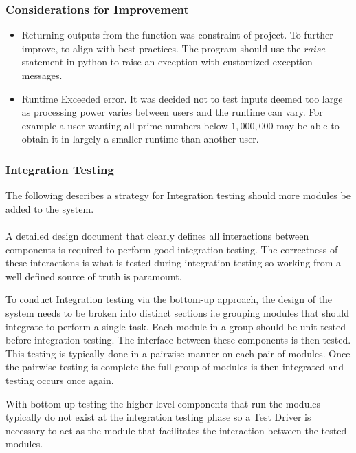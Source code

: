 \documentclass[]{article}
\begin{document}
\subsubsection{Considerations for Improvement}
\begin{itemize}
    \item Returning outputs from the function was constraint of project. To further improve, to align with best practices. The program should use the $raise$ statement in python to raise an exception with customized exception messages.
    \item Runtime Exceeded error. It was decided not to test inputs deemed too large as processing power varies between users and the runtime can vary. For example a user wanting all prime numbers below $1,000,000$ may be able to obtain it in largely a smaller runtime than another user.
\end{itemize}

\subsubsection{Integration Testing}
The following describes a strategy for Integration testing should more modules be added to the system.

\paragraph{}
A detailed design document that clearly defines all interactions between components is required to perform good integration testing. The correctness of these interactions is what is tested during integration testing so working from a well defined source of truth is paramount.

To conduct Integration testing via the bottom-up approach, the design of the system needs to be broken into distinct sections i.e grouping modules that should integrate to perform a single task. Each module in a group should be unit tested before integration testing. The interface between these components is then tested. This testing is typically done in a pairwise manner on each pair of modules. Once the pairwise testing is complete the full group of modules is then integrated and testing occurs once again. 

With bottom-up testing the higher level components that run the modules typically do not exist at the integration testing phase so a Test Driver is necessary to act as the module that facilitates the interaction between the tested modules.
\end{document}
